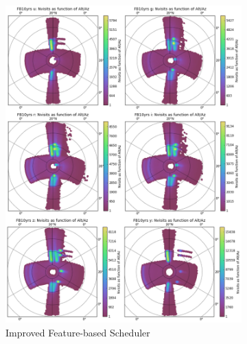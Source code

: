 \documentclass[12pt,aas_macros]{article}
\theoremstyle{definition}
\begin{document}
\begin{figure}[h!]
\begin{subfigure}{.5\textwidth}
  \centering
  \includegraphics[width=.9\linewidth]{FB10yrs_AltAz.png}
  \caption{Improved Feature-based Scheduler}
  \label{fig_10yrs_AltAz_FB}
\end{subfigure}%
\begin{subfigure}{.5\textwidth}
  \centering

\end{subfigure}
\end{figure}
\end{document}
